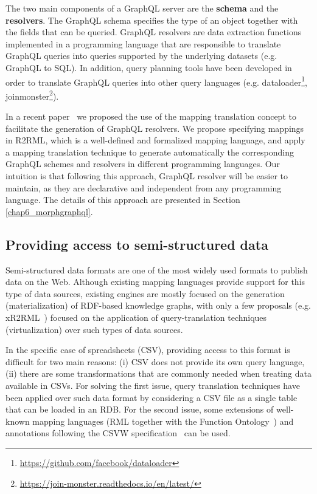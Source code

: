 The two main components of a GraphQL server are the \textbf{schema} and the \textbf{resolvers}. The GraphQL schema specifies the type of an object together with the fields that can be queried. GraphQL resolvers are data extraction functions implemented in a programming language that are responsible to translate GraphQL queries into queries supported by the underlying datasets (e.g. GraphQL to SQL). In addition, query planning tools have been developed in order to translate GraphQL queries into other query languages (e.g. dataloader\footnote{\url{https://github.com/facebook/dataloader}}, joinmonster\footnote{\url{https://join-monster.readthedocs.io/en/latest/}}).

In a recent paper~\citep{priyatna2019morph} we proposed the use of the mapping translation concept to facilitate the generation of GraphQL resolvers. We propose specifying mappings in R2RML, which is a well-defined and formalized mapping language, and apply a mapping translation technique to generate automatically the corresponding GraphQL schemes and resolvers in different programming languages. Our intuition is that following this approach, GraphQL resolver will be easier to maintain, as they are declarative and independent from any programming language. The details of this approach are presented in Section \ref{chap6_morphgraphql}.

\subsection{Providing access to semi-structured data}
Semi-structured data formats are one of the most widely used formats to publish data on the Web. Although existing mapping languages provide support for this type of data sources, existing engines are mostly focused on the generation (materialization) of RDF-based knowledge graphs, with only a few proposals (e.g. xR2RML~\citep{michel2015translation}) focused on the application of query-translation techniques (virtualization) over such types of data sources.

In the specific case of spreadsheets (CSV), providing access to this format is difficult for two main reasons: (i) CSV does not provide its own query language, (ii) there are some transformations that are commonly needed when treating data available in CSVs. For solving the first issue, query translation techniques have been applied over such data format by considering a CSV file as a single table that can be loaded in an RDB. For the second issue, some extensions of well-known mapping languages (RML together with the Function Ontology~\citep{de2017declarative}) and annotations following the CSVW specification~\citep{tennison2015model} can be used.

